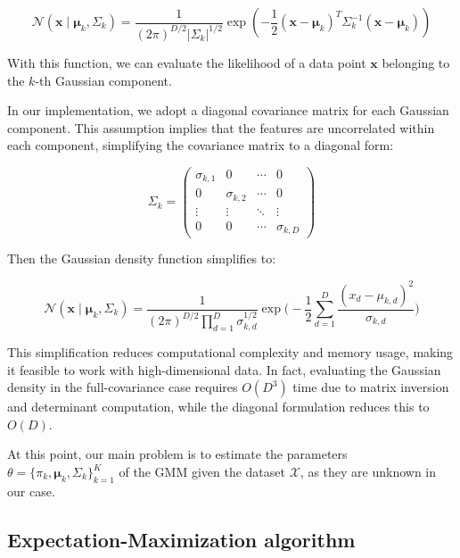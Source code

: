 \begin{equation}
\mathcal{N}(\boldsymbol{x} \mid \boldsymbol{\mu}_k, \Sigma_k)
= \frac{1}{(2\pi)^{D/2} |\Sigma_k|^{1/2}}
  \exp\left( -\frac{1}{2} (\boldsymbol{x} - \boldsymbol{\mu}_k)^T 
  \Sigma_k^{-1} (\boldsymbol{x} - \boldsymbol{\mu}_k) \right)
  \label{gaussian_density}
\end{equation}

With this function, we can evaluate the likelihood of a data point $\boldsymbol{x}$ belonging to the $k$-th Gaussian component.

In our implementation, we adopt a diagonal covariance matrix \cite{bishop2006pattern} for each Gaussian component. 
This assumption implies that the features are uncorrelated within each component, simplifying the covariance matrix to a diagonal form:


\[
\Sigma_k = 
\begin{pmatrix}
\sigma_{k,1} & 0 & \cdots & 0 \\
0 & \sigma_{k,2} & \cdots & 0 \\
\vdots & \vdots & \ddots & \vdots \\
0 & 0 & \cdots & \sigma_{k,D}
\end{pmatrix}
\]

Then the Gaussian density function simplifies to:

\begin{equation}
  \mathcal{N}(\boldsymbol{x} \mid \boldsymbol{\mu}_k, \Sigma_k)
= \frac{1}{(2\pi)^{D/2} \prod_{d=1}^D \sigma_{k,d}^{1/2}}
  \exp\Bigg(-\frac{1}{2} \sum_{d=1}^D \frac{(x_d - \mu_{k,d})^2}{\sigma_{k,d}}\Bigg)
  \label{diagonal_gaussian_density}
\end{equation}


\noindent
This simplification reduces computational complexity and memory usage,
making it feasible to work with high-dimensional data. In fact, evaluating the Gaussian density in the full-covariance 
case requires $O(D^3)$ time due to matrix inversion and determinant 
computation, while the diagonal formulation reduces this to $O(D)$. 

At this point, our main problem is to estimate the parameters $\theta = \{\pi_k, \boldsymbol{\mu}_k, \Sigma_k\}_{k=1}^K$ of the GMM given the dataset $\mathcal{X}$,
as they are unknown in our case.

\subsection{Expectation-Maximization algorithm} 

